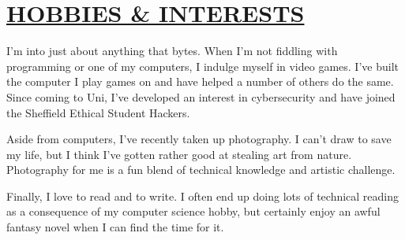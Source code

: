 \documentclass[twocolumn, a4paper, fontsize=9pt, headsepline, footsepline]{scrartcl}
\begin{document}
\section*{\ul{HOBBIES \& INTERESTS}}
\noindent
I'm into just about anything that bytes. When I'm not fiddling with programming
or one of my computers, I indulge myself in video games. I've built the computer
I play games on and have helped a number of others do the same. Since coming to
Uni, I've developed an interest in cybersecurity and have joined the Sheffield
Ethical Student Hackers.

Aside from computers, I've recently taken up photography. I can't draw to save
my life, but I think I've gotten rather good at stealing art from
nature. Photography for me is a fun blend of technical knowledge and artistic
challenge.

Finally, I love to read and to write. I often end up doing lots of technical
reading as a consequence of my computer science hobby, but certainly enjoy an
awful fantasy novel when I can find the time for it.
\end{document}
